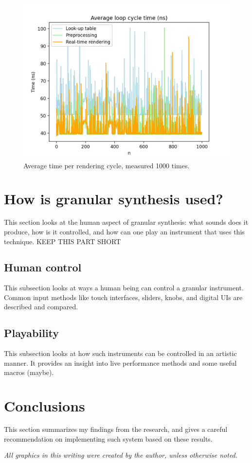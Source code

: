 \documentclass[10pt, twocolumn]{IEEEtran}
\begin{document}
\begin{figure}[ht!]
	\includegraphics[width=\linewidth]{env_average_cycle_time.png}
	\caption{Average time per rendering cycle, measured 1000 times.}
	\label{fig:env_average_cycle_time}
\end{figure}

\section{How is granular synthesis used?}
This section looks at the human aspect of granular synthesis: what sounds does it produce, how is it controlled, and how can one play an instrument that uses this technique. KEEP THIS PART SHORT

\subsection{Human control}
This subsection looks at ways a human being can control a granular instrument. Common input methods like touch interfaces, sliders, knobs, and digital UIs are described and compared.

\subsection{Playability}
This subsection looks at how such instruments can be controlled in an artistic manner. It provides an insight into live performance methods and some useful macros (maybe).

\section*{Conclusions}
This section summarizes my findings from the research, and gives a careful recommendation on implementing such system based on these results.

\printbibliography
\textit{All graphics in this writing were created by the author, unless otherwise noted.}
\end{document}
